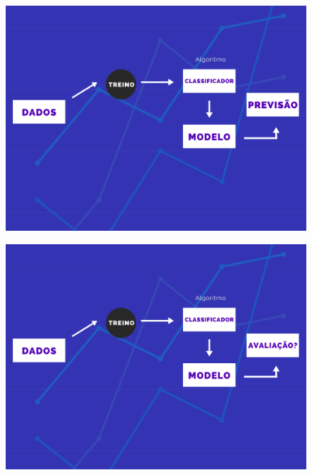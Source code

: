 \documentclass[compress]{beamer}
\begin{document}
\begin{frame}{}
    \begin{figure}
        \centering
        \includegraphics[scale=.39]{img/5.png}
    \end{figure}
\end{frame}
\begin{frame}{}
    \begin{figure}
        \centering
        \includegraphics[scale=.39]{img/6.png}
    \end{figure}
\end{frame}
\end{document}

